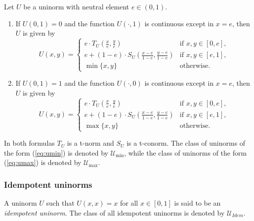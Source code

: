 \begin{theorem}
	Let $U$ be a uninorm with neutral element $e \in (0,1)$.
	\begin{enumerate}[label=(\roman*)]
		\item If $U(0,1)=0$ and the function $U(\cdot,1)$ is continuous except in $x=e$, then $U$ is given by
		\begin{equation}\label{eq:umin}
			U(x,y)
			=
			\left\{\begin{array}{ll}
				e \cdot T_U\left(\frac{x}{e},\frac{y}{e}\right) & \text{if } x,y \in [0,e], \\
				e + (1-e) \cdot S_U\left(\frac{x-e}{1-e},\frac{y-e}{1-e}\right) & \text{if } x,y \in [e,1], \\
				\min\{x,y\} & \text{otherwise.}
			\end{array}
			\right.
		\end{equation}
		\item If $U(0,1)=1$ and the function $U(\cdot,0)$ is continuous except in $x=e$, then $U$ is given by
		\begin{equation}\label{eq:umax}
			U(x,y)
			=
			\left\{\begin{array}{ll}
				e \cdot T_U\left(\frac{x}{e},\frac{y}{e}\right) & \text{if } x,y \in [0,e], \\
				e + (1-e) \cdot S_U\left(\frac{x-e}{1-e},\frac{y-e}{1-e}\right) & \text{if } x,y \in [e,1], \\
				\max\{x,y\} & \text{otherwise.}
			\end{array}
			\right.
		\end{equation}
	\end{enumerate}
	In both formulas $T_U$ is a t-norm and $S_U$ is a t-conorm. The class of uninorms of the form (\ref{eq:umin}) is denoted by $\mathcal{U}_{\min}$, while the class of uninorms of the form (\ref{eq:umax}) is denoted by $\mathcal{U}_{\max}$.
\end{theorem}

\subsubsection{Idempotent uninorms}

\begin{definition}
	A uninorm $U$ such that $U(x,x)=x$ for all $x \in [0,1]$ is said to be an \emph{idempotent uninorm}. The class of all idempotent uninorms is denoted by $\mathcal{U}_{Idem}$.
\end{definition}

